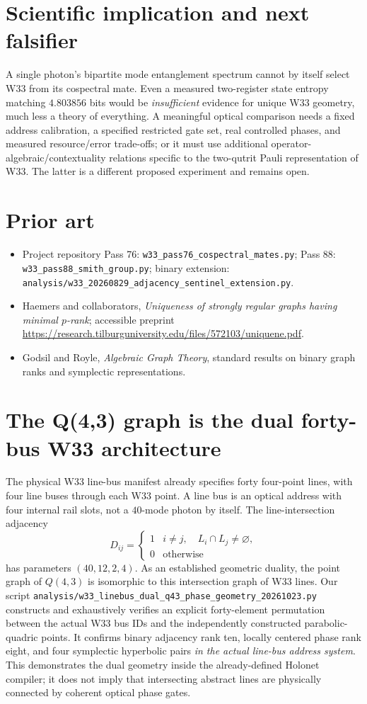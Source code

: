 \documentclass[10pt]{article}
\begin{document}
\section{Scientific implication and next falsifier}
A single photon's bipartite mode
entanglement spectrum cannot by itself
select W33 from its cospectral mate.
Even a measured two-register state entropy
matching $4.803856$ bits would be
\emph{insufficient} evidence for unique
W33 geometry, much less a theory of everything.
A meaningful optical comparison needs a fixed
address calibration, a specified restricted
gate set, real controlled phases, and measured
resource/error trade-offs; or it must use
additional operator-algebraic/contextuality
relations specific to the two-qutrit Pauli
representation of W33. The latter is a
different proposed experiment and remains open.

\section{Prior art}
\begin{itemize}
\item Project repository Pass 76:
\texttt{w33\_pass76\_cospectral\_mates.py};
Pass 88: \texttt{w33\_pass88\_smith\_group.py};
binary extension:
\texttt{analysis/w33\_20260829\_adjacency\_sentinel\_extension.py}.
\item Haemers and collaborators,
\emph{Uniqueness of strongly regular graphs having
minimal $p$-rank}; accessible preprint
\url{https://research.tilburguniversity.edu/files/572103/uniquene.pdf}.
\item Godsil and Royle, \emph{Algebraic Graph Theory},
standard results on binary graph ranks
and symplectic representations.
\end{itemize}

\section{The Q(4,3) graph is the dual forty-bus W33 architecture}
The physical W33 line-bus manifest already specifies
forty four-point lines, with four line buses through each
W33 point. A line bus is an optical address with four
internal rail slots, not a $40$-mode photon by itself.
The line-intersection adjacency
\[
D_{ij}=\begin{cases}
1&i\ne j,\quad L_i\cap L_j\ne\varnothing,\\
0&\text{otherwise}
\end{cases}
\]
has parameters $(40,12,2,4)$.
As an established geometric duality,
the point graph of $Q(4,3)$ is isomorphic
to this intersection graph of W33 lines.
Our script \texttt{analysis/w33\_linebus\_dual\_q43\_phase\_geometry\_20261023.py}
constructs and exhaustively verifies an explicit
forty-element permutation between the actual
W33 bus IDs and the independently constructed
parabolic-quadric points. It confirms binary
adjacency rank ten, locally centered phase
rank eight, and four symplectic hyperbolic
pairs \emph{in the actual line-bus address system}.
This demonstrates the dual geometry inside the
already-defined Holonet compiler; it does
not imply that intersecting abstract lines
are physically connected by coherent optical
phase gates.
\end{document}
